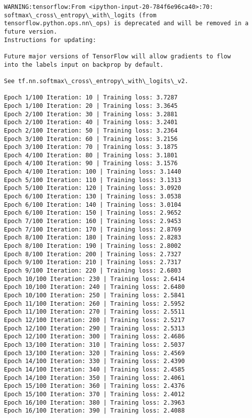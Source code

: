 \documentclass[11pt]{article}
\begin{document}
    \begin{Verbatim}[commandchars=\\\{\}]
WARNING:tensorflow:From <ipython-input-20-784f6e96ca40>:70: softmax\_cross\_entropy\_with\_logits (from tensorflow.python.ops.nn\_ops) is deprecated and will be removed in a future version.
Instructions for updating:

Future major versions of TensorFlow will allow gradients to flow
into the labels input on backprop by default.

See tf.nn.softmax\_cross\_entropy\_with\_logits\_v2.

Epoch 1/100 Iteration: 10 | Training loss: 3.7287
Epoch 1/100 Iteration: 20 | Training loss: 3.3645
Epoch 2/100 Iteration: 30 | Training loss: 3.2881
Epoch 2/100 Iteration: 40 | Training loss: 3.2401
Epoch 2/100 Iteration: 50 | Training loss: 3.2364
Epoch 3/100 Iteration: 60 | Training loss: 3.2156
Epoch 3/100 Iteration: 70 | Training loss: 3.1875
Epoch 4/100 Iteration: 80 | Training loss: 3.1801
Epoch 4/100 Iteration: 90 | Training loss: 3.1576
Epoch 4/100 Iteration: 100 | Training loss: 3.1440
Epoch 5/100 Iteration: 110 | Training loss: 3.1313
Epoch 5/100 Iteration: 120 | Training loss: 3.0920
Epoch 6/100 Iteration: 130 | Training loss: 3.0538
Epoch 6/100 Iteration: 140 | Training loss: 3.0104
Epoch 6/100 Iteration: 150 | Training loss: 2.9652
Epoch 7/100 Iteration: 160 | Training loss: 2.9453
Epoch 7/100 Iteration: 170 | Training loss: 2.8769
Epoch 8/100 Iteration: 180 | Training loss: 2.8283
Epoch 8/100 Iteration: 190 | Training loss: 2.8002
Epoch 8/100 Iteration: 200 | Training loss: 2.7327
Epoch 9/100 Iteration: 210 | Training loss: 2.7317
Epoch 9/100 Iteration: 220 | Training loss: 2.6803
Epoch 10/100 Iteration: 230 | Training loss: 2.6414
Epoch 10/100 Iteration: 240 | Training loss: 2.6480
Epoch 10/100 Iteration: 250 | Training loss: 2.5841
Epoch 11/100 Iteration: 260 | Training loss: 2.5952
Epoch 11/100 Iteration: 270 | Training loss: 2.5511
Epoch 12/100 Iteration: 280 | Training loss: 2.5217
Epoch 12/100 Iteration: 290 | Training loss: 2.5313
Epoch 12/100 Iteration: 300 | Training loss: 2.4686
Epoch 13/100 Iteration: 310 | Training loss: 2.5037
Epoch 13/100 Iteration: 320 | Training loss: 2.4569
Epoch 14/100 Iteration: 330 | Training loss: 2.4390
Epoch 14/100 Iteration: 340 | Training loss: 2.4585
Epoch 14/100 Iteration: 350 | Training loss: 2.4061
Epoch 15/100 Iteration: 360 | Training loss: 2.4376
Epoch 15/100 Iteration: 370 | Training loss: 2.4012
Epoch 16/100 Iteration: 380 | Training loss: 2.3963
Epoch 16/100 Iteration: 390 | Training loss: 2.4088

\end{Verbatim}
\end{document}
